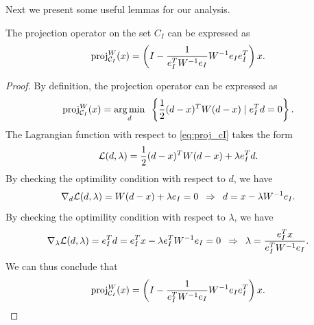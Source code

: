 Next we present some useful lemmas for our analysis.

\begin{lemma} \label{lemma:projection1}
    The projection operator on the set $C_I$ can be expressed as 
    \[\operatorname{proj}_{\mathcal{C}_I}^{W}(x) = \left(I - \frac{1}{e_I^T W^{-1} e_I}W^{-1}e_I e_I^T\right)x.\]
\end{lemma}
\begin{proof}
    By definition, the projection operator can be expressed as 
\begin{equation} \label{eq:proj_cI}
    \operatorname{proj}_{\mathcal{C}_I}^{W}(x) = \underset{d}{\textrm{arg}\,{\min}}\enskip \left\{ \frac{1}{2} (d - x)^TW(d-x) \mid e_I^Td = 0 \right\}.
\end{equation}
The Lagrangian function with respect to \eqref{eq:proj_cI} takes the form 
\[\mathcal{L}(d, \lambda) = \frac{1}{2} (d - x)^TW(d-x) + \lambda e_I^Td.\]
By checking the optimility condition with respect to $d$, we have
\[\nabla_d \mathcal{L}(d, \lambda) = W(d - x) + \lambda e_I = 0 \enspace\Rightarrow\enspace d = x - \lambda W^{-1} e_I.\]
By checking the optimility condition with respect to $\lambda$, we have 
\[
    \nabla_\lambda \mathcal{L}(d, \lambda) = e_I^Td
    = e_I^Tx - \lambda e_I^T W^{-1} e_I = 0 
    \enspace\Rightarrow\enspace
    \lambda = \frac{e_I^T x}{e_I^T W^{-1} e_I}.
\]
We can thus conclude that 
\[\operatorname{proj}_{\mathcal{C}_I}^{W}(x) = \left(I - \frac{1}{e_I^T W^{-1} e_I}W^{-1}e_I e_I^T\right)x.\]
\end{proof}


